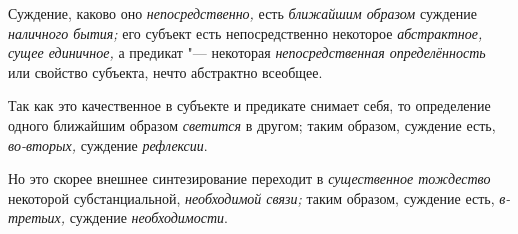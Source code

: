 Суждение, каково оно {\em непосредственно,} есть {\em ближайшим образом}
суждение {\em наличного бытия;} его субъект есть непосредственно некоторое
{\em абстрактное, сущее единичное,} а предикат "--- некоторая
{\em непосредственная определённость} или свойство субъекта, нечто
абстрактно всеобщее.

Так как это качественное в субъекте и предикате снимает себя,
то определение одного ближайшим образом {\em светится} в другом;
таким образом, суждение есть, {\em во-вторых,} суждение {\em рефлексии}.

Но это скорее внешнее синтезирование
переходит в {\em существенное тождество} некоторой субстанциальной,
{\em необходимой связи;} таким образом, суждение есть, {\em в-третьих,}
суждение {\em необходимости}.


